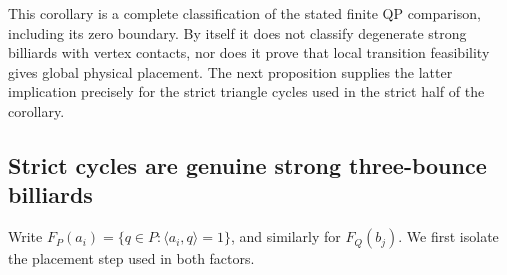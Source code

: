 This corollary is a complete classification of the stated finite QP
comparison, including its zero boundary.  By itself it does not classify
degenerate strong billiards with vertex contacts, nor does it prove that local
transition feasibility gives global physical placement.  The next proposition
supplies the latter implication precisely for the strict triangle cycles used
in the strict half of the corollary.

\subsection{Strict cycles are genuine strong three-bounce billiards}
\label{subsec:product-triangle-physical-realization}

Write \(F_P(a_i)=\{q\in P:\langle a_i,q\rangle=1\}\), and similarly for
\(F_Q(b_j)\).  We first isolate the placement step used in both factors.

